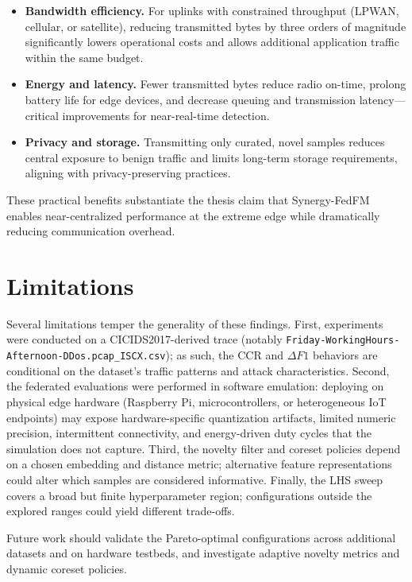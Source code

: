 \begin{itemize}
\item \textbf{Bandwidth efficiency.} For uplinks with constrained throughput (LPWAN, cellular, or satellite), reducing transmitted bytes by three orders of magnitude significantly lowers operational costs and allows additional application traffic within the same budget.
\item \textbf{Energy and latency.} Fewer transmitted bytes reduce radio on-time, prolong battery life for edge devices, and decrease queuing and transmission latency—critical improvements for near-real-time detection.
\item \textbf{Privacy and storage.} Transmitting only curated, novel samples reduces central exposure to benign traffic and limits long-term storage requirements, aligning with privacy-preserving practices.
\end{itemize}

These practical benefits substantiate the thesis claim that Synergy-FedFM enables near-centralized performance at the extreme edge while dramatically reducing communication overhead.

\section{Limitations}
Several limitations temper the generality of these findings. First, experiments were conducted on a CICIDS2017-derived trace (notably \texttt{Friday-WorkingHours-Afternoon-DDos.pcap_ISCX.csv}); as such, the CCR and $\Delta F1$ behaviors are conditional on the dataset's traffic patterns and attack characteristics. Second, the federated evaluations were performed in software emulation: deploying on physical edge hardware (Raspberry Pi, microcontrollers, or heterogeneous IoT endpoints) may expose hardware-specific quantization artifacts, limited numeric precision, intermittent connectivity, and energy-driven duty cycles that the simulation does not capture. Third, the novelty filter and coreset policies depend on a chosen embedding and distance metric; alternative feature representations could alter which samples are considered informative. Finally, the LHS sweep covers a broad but finite hyperparameter region; configurations outside the explored ranges could yield different trade-offs.

Future work should validate the Pareto-optimal configurations across additional datasets and on hardware testbeds, and investigate adaptive novelty metrics and dynamic coreset policies.

